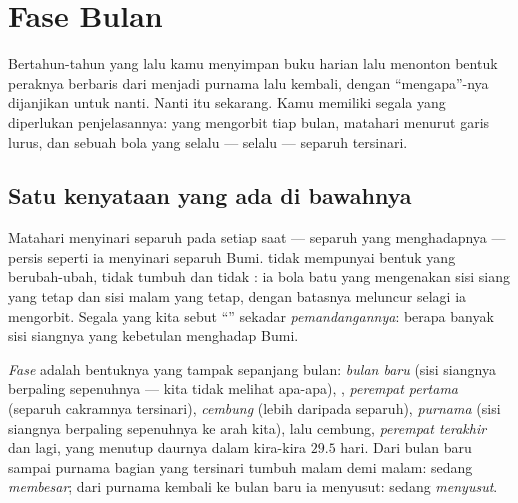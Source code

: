 \chapter{Fase Bulan}\label{ch:g7:moon-phases}

Bertahun-tahun yang lalu kamu menyimpan buku harian  lalu
menonton bentuk peraknya berbaris dari  menjadi purnama lalu
kembali, dengan ``mengapa''-nya dijanjikan untuk nanti. Nanti itu
sekarang. Kamu memiliki segala yang diperlukan penjelasannya: 
yang mengorbit tiap bulan,  matahari menurut garis lurus, dan
sebuah bola yang selalu --- selalu --- separuh tersinari.

\section{Satu kenyataan yang ada di bawahnya}

\begin{proposition}\label{prop:g7:moon-phases:halflit}
Matahari menyinari separuh  pada setiap saat --- separuh yang
menghadapnya --- persis seperti ia menyinari separuh Bumi.  tidak
mempunyai bentuk yang berubah-ubah, tidak tumbuh dan tidak :
ia bola batu yang mengenakan sisi siang yang tetap dan sisi malam yang
tetap, dengan batasnya meluncur selagi ia mengorbit. Segala yang kita
sebut ``'' sekadar \emph{pemandangannya}: berapa banyak sisi
siangnya yang kebetulan menghadap Bumi.
\end{proposition}

\begin{definition}[Fase]\label{def:g7:moon-phases:phases}
\emph{Fase}  adalah bentuknya yang tampak sepanjang
bulan: \emph{bulan baru} (sisi siangnya berpaling sepenuhnya --- kita
tidak melihat apa-apa), \emph{}, \emph{perempat pertama}
(separuh cakramnya tersinari), \emph{cembung} (lebih daripada
separuh), \emph{purnama} (sisi siangnya berpaling sepenuhnya ke arah
kita), lalu cembung, \emph{perempat terakhir} dan  lagi, yang
menutup daurnya dalam kira-kira $29.5$ hari. Dari bulan baru sampai
purnama bagian yang tersinari tumbuh malam demi malam:  sedang
\emph{membesar}; dari purnama kembali ke bulan baru ia
menyusut: sedang \emph{menyusut}.
\end{definition}


